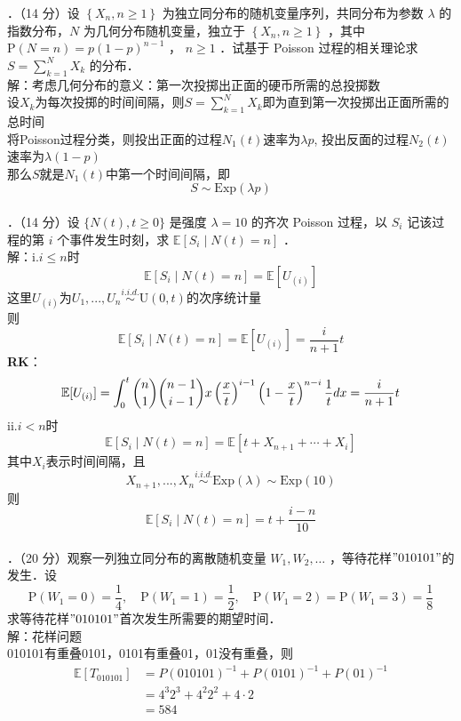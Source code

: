 \documentclass[UTF8]{ctexart}
\begin{document}
．（14 分）设 $\left\{X_n, n \geq 1\right\}$ 为独立同分布的随机变量序列，共同分布为参数 $\lambda$ 的指数分布，$N$ 为几何分布随机变量，独立于 $\left\{X_n, n \geq 1\right\}$ ，其中 $\mathrm{P}(N=n)=p(1-p)^{n-1}$ ， $n \geq 1$ ．试基于 Poisson 过程的相关理论求 $S=\sum\limits_{k=1}^N X_k$ 的分布．\\
解：考虑几何分布的意义：第一次投掷出正面的硬币所需的总投掷数\\
设$X_k$为每次投掷的时间间隔，则$S=\sum\limits_{k=1}^N X_k$即为直到第一次投掷出正面所需的总时间\\
将Poisson过程分类，则投出正面的过程$N_1(t)$速率为$\lambda p$,
投出反面的过程$N_2(t)$速率为$\lambda (1-p)$\\
那么$S$就是$N_1(t)$中第一个时间间隔，即
\[
S \sim \mathrm{Exp}(\lambda p)
\]\\





．（14 分）设 $\{N(t), t \geq 0\}$ 是强度 $\lambda=10$ 的齐次 Poisson 过程，以 $S_i$ 记该过程的第 $i$ 个事件发生时刻，求 $\mathbb{E}\left[S_i \mid N(t)=n\right]$ ．\\
解：i.$i \le n$时\\
\[
\mathbb{E}[S_i\mid N(t)=n]=\mathbb{E}[U_{(i)}]
\]
这里$U_{(i)}$为$U_1,...,U_n\stackrel{i.i.d.}{\sim} \mathrm{U}(0,t)$的次序统计量\\
则
\[
\mathbb{E}[S_i\mid N(t)=n]=\mathbb{E}[U_{(i)}]=\frac{i}{n+1}t
\]
\textbf{RK}：\\
$$
\mathbb{E}[U_{(i)}]=\int_{0}^{t} \dbinom{n}{1} \dbinom{n-1}{i-1} x\left(\frac{x}{t} \right)^{i-1} \left( 1-\frac{x}{t}\right)^{n-i} \frac{1}{t} dx=  \frac{i}{n+1}t
$$
ii.$i<n$时
\[
\mathbb{E}[S_i\mid N(t)=n]=\mathbb{E}[t+X_{n+1}+\cdots+X_i]
\]
其中$X_i$表示时间间隔，且
\[
X_{n+1},...,X_n \stackrel{i.i.d.}{\sim} \mathrm{Exp}(\lambda)\sim \mathrm{Exp}(10)
\]
则
\[
\mathbb{E}[S_i\mid N(t)=n]=t+\frac{i-n}{10}
\]\\




．（20 分）观察一列独立同分布的离散随机变量 $W_1, W_2, \ldots$ ，等待花样$" 010101 "$的发生．设
$$
\mathrm{P}\left(W_1=0\right)=\frac{1}{4}, \quad \mathrm{P}\left(W_1=1\right)=\frac{1}{2}, \quad \mathrm{P}\left(W_1=2\right)=\mathrm{P}\left(W_1=3\right)=\frac{1}{8}
$$
求等待花样$"010101"$首次发生所需要的期望时间．\\
解：花样问题\\
010101有重叠0101，0101有重叠01，01没有重叠，则\\
\begin{align*}
	\mathbb{E}[T_{010101}] & =P(010101)^{-1}+P(0101)^{-1}+P(01)^{-1} \\
	& =4^3 2^3+4^2 2^2+4 \cdot 2\\
	&=584
\end{align*}
\end{document}
